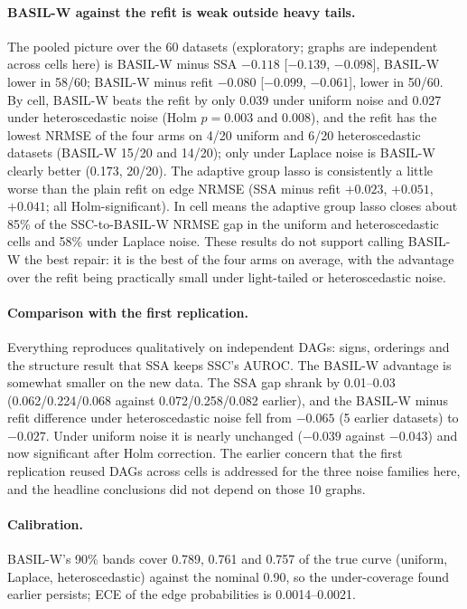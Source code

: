 \paragraph{BASIL-W against the refit is weak outside heavy tails.} The pooled picture over the 60 datasets (exploratory; graphs are independent across cells here) is BASIL-W minus SSA $-0.118$ [$-0.139$, $-0.098$], BASIL-W lower in 58/60; BASIL-W minus refit $-0.080$ [$-0.099$, $-0.061$], lower in 50/60. By cell, BASIL-W beats the refit by only 0.039 under uniform noise and 0.027 under heteroscedastic noise (Holm $p=0.003$ and $0.008$), and the refit has the lowest NRMSE of the four arms on 4/20 uniform and 6/20 heteroscedastic datasets (BASIL-W 15/20 and 14/20); only under Laplace noise is BASIL-W clearly better (0.173, 20/20). The adaptive group lasso is consistently a little worse than the plain refit on edge NRMSE (SSA minus refit $+0.023$, $+0.051$, $+0.041$; all Holm-significant). In cell means the adaptive group lasso closes about 85\% of the SSC-to-BASIL-W NRMSE gap in the uniform and heteroscedastic cells and 58\% under Laplace noise. These results do not support calling BASIL-W the best repair: it is the best of the four arms on average, with the advantage over the refit being practically small under light-tailed or heteroscedastic noise.

\paragraph{Comparison with the first replication.} Everything reproduces qualitatively on independent DAGs: signs, orderings and the structure result that SSA keeps SSC's AUROC. The BASIL-W advantage is somewhat smaller on the new data. The SSA gap shrank by 0.01--0.03 (0.062/0.224/0.068 against 0.072/0.258/0.082 earlier), and the BASIL-W minus refit difference under heteroscedastic noise fell from $-0.065$ (5 earlier datasets) to $-0.027$. Under uniform noise it is nearly unchanged ($-0.039$ against $-0.043$) and now significant after Holm correction. The earlier concern that the first replication reused DAGs across cells is addressed for the three noise families here, and the headline conclusions did not depend on those 10 graphs.

\paragraph{Calibration.} BASIL-W's 90\% bands cover 0.789, 0.761 and 0.757 of the true curve (uniform, Laplace, heteroscedastic) against the nominal 0.90, so the under-coverage found earlier persists; ECE of the edge probabilities is 0.0014--0.0021.

